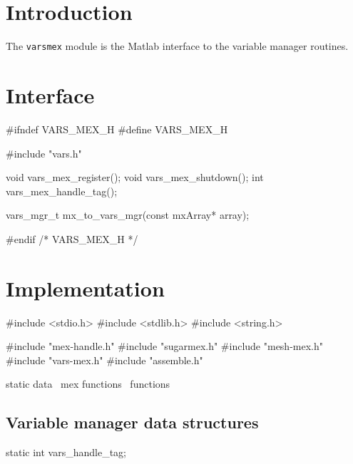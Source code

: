 
\section{Introduction}

The {\tt{}vars{}mex} module is the Matlab interface to the variable
manager routines.


\section{Interface}

\endmoddef
#ifndef VARS_MEX_H
#define VARS_MEX_H

#include "vars.h"

void vars_mex_register();
void vars_mex_shutdown();
int  vars_mex_handle_tag();

vars_mgr_t mx_to_vars_mgr(const mxArray* array);

#endif /* VARS_MEX_H */
\nwendcode{}\nwdocspar


\section{Implementation}

\nwenddocs{}\endmoddef
#include <stdio.h>
#include <stdlib.h>
#include <string.h>

#include "mex-handle.h"
#include "sugarmex.h"
#include "mesh-mex.h"
#include "vars-mex.h"
#include "assemble.h"

\LA{}static data~{\nwtagstyle{}}\RA{}
\LA{}mex functions~{\nwtagstyle{}}\RA{}
\LA{}functions~{\nwtagstyle{}}\RA{}
\nwendcode{}\nwdocspar


\subsection{Variable manager data structures}

\nwenddocs{}\endmoddef
static int vars_handle_tag;

